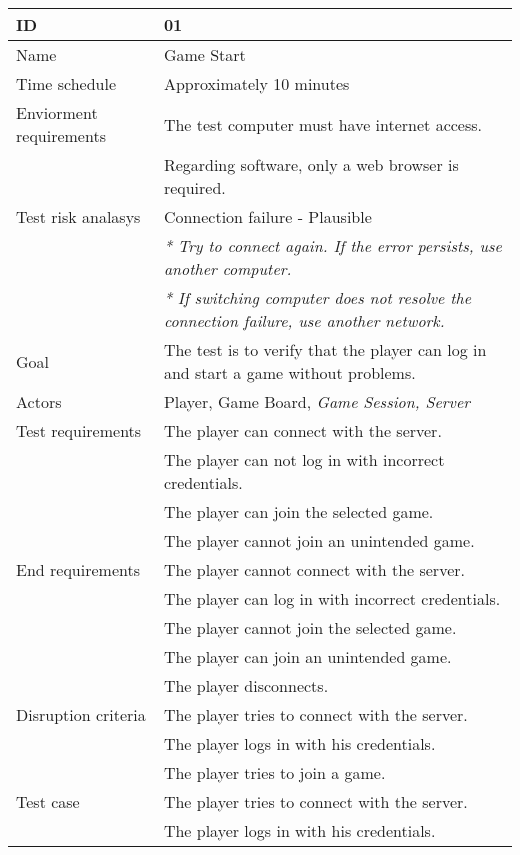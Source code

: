 

{\footnotesize
\begin{table}[H]
\begin{tabular}{| p{5cm} | p{10cm} |}\hline
	\textbf{ID}	& \textbf{01}\\ \hline
	Name		& Game Start\\ \hline
	Time schedule	& Approximately 10 minutes \\ \hline
	Enviorment requirements 
		& The test computer must have internet access. \\
		& Regarding software, only a web browser is required. \\ \hline
	Test risk analasys 
		& Connection failure - Plausible \\ 
		& \emph{* Try to connect again. If the error persists, use another computer.} \\
		& \emph{* If switching computer does not resolve the connection failure, use another network.}\\ \hline
	Goal	& The test is to verify that the player can log in and start a game without problems. \\ \hline
	Actors	& Player, Game Board, \emph{Game Session, Server}\\ \hline
	Test requirements
		& The player can connect with the server. \\
		& The player can not log in with incorrect credentials. \\
		& The player can join the selected game. \\
		& The player cannot join an unintended game.\\ \hline
	End requirements 
		& The player cannot connect with the server. \\
		& The player can log in with incorrect credentials. \\
		& The player cannot join the selected game. \\
		& The player can join an unintended game. \\
		& The player disconnects. \\ \hline
	Disruption criteria 
		& The player tries to connect with the server. \\
		& The player logs in with his credentials. \\
		& The player tries to join a game. \\ \hline
	Test case
		& The player tries to connect with the server. \\
		& The player logs in with his credentials. \\

\end{tabular}
\end{table}}

